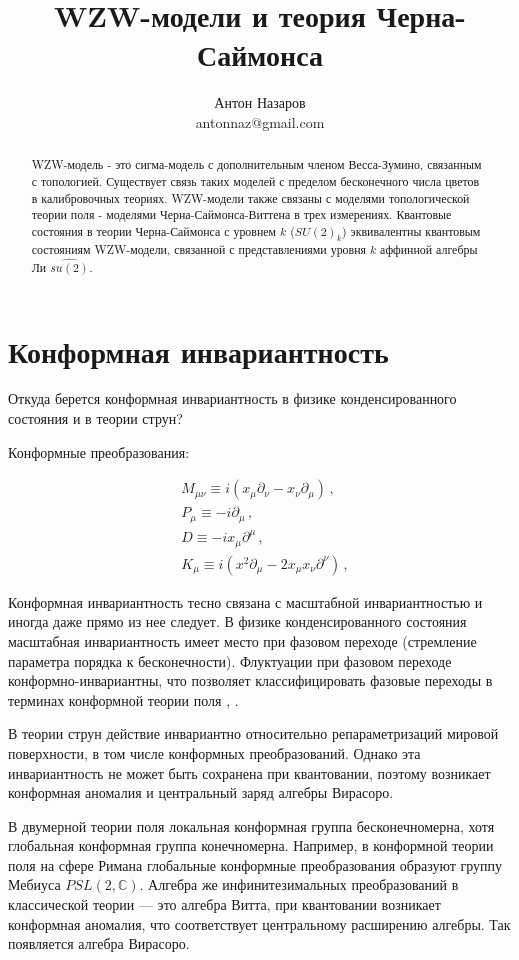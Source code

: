 \documentclass[a4paper,12pt]{article}
\title{WZW-модели и теория Черна-Саймонса}
\author{Антон Назаров\\ antonnaz@gmail.com}
\theoremstyle{definition} \newtheorem{Def}{Definition}
\begin{document}
\maketitle
\begin{abstract}
WZW-модель - это сигма-модель с дополнительным членом Весса-Зумино, связанным с топологией. Существует связь таких моделей с пределом бесконечного числа цветов в калибровочных теориях. WZW-модели также связаны с моделями топологической теории поля - моделями Черна-Саймонса-Виттена в трех измерениях. Квантовые состояния в теории Черна-Саймонса с уровнем $k$ ($SU(2)_k$) эквивалентны квантовым состояниям WZW-модели, связанной с представлениями уровня $k$ аффинной алгебры Ли $\widehat{su(2)}$.
\end{abstract}

\section{Конформная инвариантность}
\label{sec:conformal-invariance}

Откуда берется конформная инвариантность в физике конденсированного состояния и в теории струн?

Конформные преобразования:

    \begin{align} & M_{\mu\nu} \equiv i(x_\mu\partial_\nu-x_\nu\partial_\mu) \,, \\ &P_\mu \equiv-i\partial_\mu \,, \\ &D \equiv-ix_\mu\partial^\mu \,, \\ &K_\mu \equiv i(x^2\partial_\mu-2x_\mu x_\nu\partial^\nu) \,, \end{align}

Конформная инвариантность тесно связана с масштабной инвариантностью и иногда даже прямо из нее следует. В физике конденсированного состояния масштабная инвариантность имеет место при фазовом переходе (стремление параметра порядка к бесконечности). Флуктуации при фазовом переходе конформно-инвариантны, что позволяет классифицировать фазовые переходы в терминах конформной теории поля \cite{Polyakov:1970xd}, \cite{belavin1984ics}.

В теории струн действие инвариантно относительно репараметризаций мировой поверхности, в том числе конформных преобразований.
Однако эта инвариантность не может быть сохранена при квантовании, поэтому возникает конформная аномалия и центральный заряд алгебры Вирасоро.

В двумерной теории поля локальная конформная группа бесконечномерна, хотя глобальная конформная группа конечномерна. Например, в конформной теории поля на сфере Римана глобальные конформные преобразования образуют группу Мебиуса $PSL(2,\mathbb{C})$. Алгебра же инфинитезимальных преобразований в классической теории --- это алгебра Витта, при квантовании возникает конформная аномалия, что соответствует центральному расширению алгебры. Так появляется алгебра Вирасоро.
\end{document}
